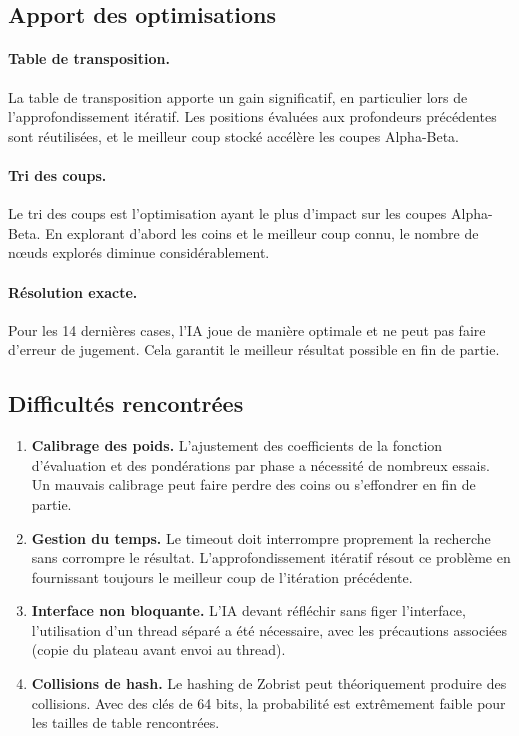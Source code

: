 \documentclass[12pt, a4paper]{article}
\begin{document}


\subsection{Apport des optimisations}

\paragraph{Table de transposition.}
La table de transposition apporte un gain significatif, en particulier lors de l'approfondissement itératif. Les positions évaluées aux profondeurs précédentes sont réutilisées, et le meilleur coup stocké accélère les coupes Alpha-Beta.

\paragraph{Tri des coups.}
Le tri des coups est l'optimisation ayant le plus d'impact sur les coupes Alpha-Beta. En explorant d'abord les coins et le meilleur coup connu, le nombre de nœuds explorés diminue considérablement.

\paragraph{Résolution exacte.}
Pour les 14 dernières cases, l'IA joue de manière optimale et ne peut pas faire d'erreur de jugement. Cela garantit le meilleur résultat possible en fin de partie.


\subsection{Difficultés rencontrées}

\begin{enumerate}
    \item \textbf{Calibrage des poids.} L'ajustement des coefficients de la fonction d'évaluation et des pondérations par phase a nécessité de nombreux essais. Un mauvais calibrage peut faire perdre des coins ou s'effondrer en fin de partie.

    \item \textbf{Gestion du temps.} Le timeout doit interrompre proprement la recherche sans corrompre le résultat. L'approfondissement itératif résout ce problème en fournissant toujours le meilleur coup de l'itération précédente.

    \item \textbf{Interface non bloquante.} L'IA devant réfléchir sans figer l'interface, l'utilisation d'un thread séparé a été nécessaire, avec les précautions associées (copie du plateau avant envoi au thread).

    \item \textbf{Collisions de hash.} Le hashing de Zobrist peut théoriquement produire des collisions. Avec des clés de 64 bits, la probabilité est extrêmement faible pour les tailles de table rencontrées.
\end{enumerate}
\end{document}
